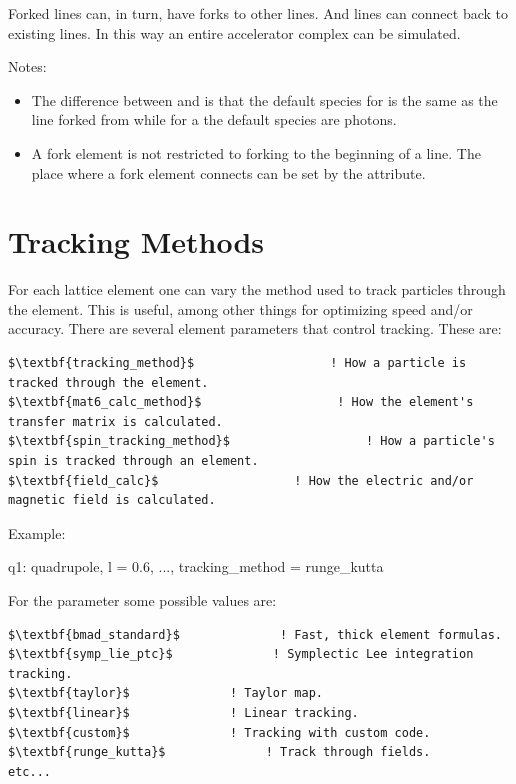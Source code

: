 \documentclass{hitec}
\newcommand{\Section}[1]{\section{#1}\vspace*{-1ex}}
\begin{document}
Forked lines can, in turn, have forks to other lines. And lines can connect back to existing lines. In this
way an entire accelerator complex can be simulated. 

Notes:
\vspace{-10 pt}
\begin{itemize}
\item The difference between  and  is that the default species for  is
the same as the line forked from while for a  the default species are photons.
\item A fork element is not restricted to forking to the beginning of a line. 
The place where a fork element connects can be set by the  attribute.
\end{itemize}

\newpage

\Section{Tracking Methods}
\label{s:methods}

For each lattice element one can vary the method used to track particles through the element. This is
useful, among other things for optimizing speed and/or accuracy. There are several element parameters
that control tracking. These are:
\begin{lstlisting}[mathescape]
$\textbf{tracking_method}$                   ! How a particle is tracked through the element.
$\textbf{mat6_calc_method}$                   ! How the element's transfer matrix is calculated.
$\textbf{spin_tracking_method}$                   ! How a particle's spin is tracked through an element.
$\textbf{field_calc}$                   ! How the electric and/or magnetic field is calculated.
\end{lstlisting}

Example:
\begin{code}
q1: quadrupole, l = 0.6, ..., tracking_method = runge_kutta
\end{code}

For the  parameter some possible values are:
\begin{lstlisting}[mathescape]
$\textbf{bmad_standard}$              ! Fast, thick element formulas.
$\textbf{symp_lie_ptc}$              ! Symplectic Lee integration tracking.
$\textbf{taylor}$              ! Taylor map.
$\textbf{linear}$              ! Linear tracking.
$\textbf{custom}$              ! Tracking with custom code.
$\textbf{runge_kutta}$              ! Track through fields.
etc...
\end{lstlisting}
\end{document}
